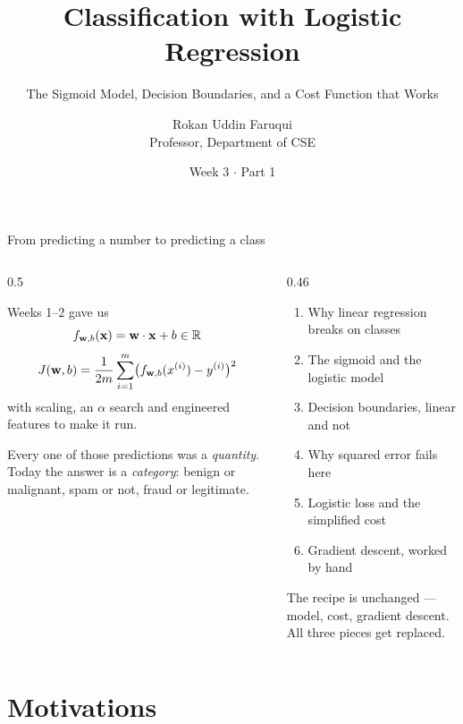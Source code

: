 \documentclass[aspectratio=169,10pt]{beamer}
\title[CSE 815 -- Week 3, Part 1]{Classification with Logistic Regression}
\subtitle{The Sigmoid Model, Decision Boundaries, and a Cost Function that Works}
\author{Rokan Uddin Faruqui\\ \small Professor, Department of CSE}
\institute{\small University of Chittagong \\ \texttt{rufaruqui@cu.ac.bd}}
\date[Week 3 / Part 1]{Week 3 $\cdot$ Part 1}
\begin{document}
\begin{frame}
  \titlepage
\end{frame}

\begin{frame}{From predicting a number to predicting a class}
  \begin{columns}[T,onlytextwidth]
    \begin{column}{0.5\textwidth}
      \begin{block}{Weeks 1--2 gave us}
        \[ f_{\mathbf{w},b}(\mathbf{x})=\mathbf{w}\cdot\mathbf{x} + b \in \mathbb{R} \]
        \[ J(\mathbf{w},b)=\frac{1}{2m}\sum_{i=1}^{m}\bigl(f_{\mathbf{w},b}(x^{(i)})-y^{(i)}\bigr)^2 \]
        with scaling, an $\alpha$ search and engineered features to make it run.
      \end{block}
      \footnotesize
      Every one of those predictions was a \emph{quantity}. Today the answer is a
      \emph{category}: benign or malignant, spam or not, fraud or legitimate.
    \end{column}
    \begin{column}{0.46\textwidth}
      \begin{keyidea}[Today]
        \footnotesize
        \begin{enumerate}
          \item Why linear regression breaks on classes  
          \item The sigmoid and the logistic model 
          \item Decision boundaries, linear and not 
          \item Why squared error fails here 
          \item Logistic loss and the simplified cost  
          \item Gradient descent, worked by hand 
        \end{enumerate}
      \end{keyidea}
      \footnotesize The recipe is unchanged --- model, cost, gradient descent. All three
      pieces get replaced.
    \end{column}
  \end{columns}
\end{frame}

\section{Motivations}
\end{document}
